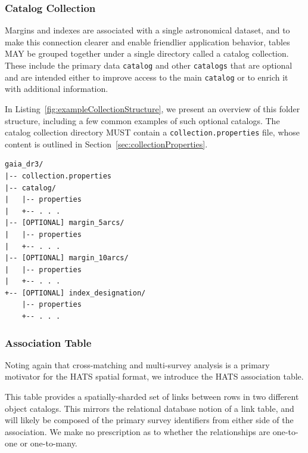 \documentclass[11pt,a4paper]{ivoa}
\begin{document}
\subsubsection{Catalog Collection} \label{sec:collection}

Margins and indexes are associated with a single astronomical dataset, and to make this connection clearer and enable friendlier application behavior, tables MAY be grouped together under a single directory called a catalog collection.
These include the primary data \texttt{catalog} and other \texttt{catalogs} that are optional and are intended either to improve access to the main \texttt{catalog} or to enrich it with additional information. 

In Listing~\ref{fig:exampleCollectionStructure}, we present an overview of this folder structure, including a few common examples of such optional catalogs.
The catalog collection directory MUST contain a \texttt{collection.properties} file, whose content is outlined in Section~\ref{sec:collectionProperties}.

\begin{minipage}{\linewidth}
\begin{lstlisting}[caption=Example collection directory contents, label=fig:exampleCollectionStructure]
gaia_dr3/
|-- collection.properties
|-- catalog/
|   |-- properties
|   +-- . . .
|-- [OPTIONAL] margin_5arcs/
|   |-- properties
|   +-- . . .
|-- [OPTIONAL] margin_10arcs/
|   |-- properties
|   +-- . . .
+-- [OPTIONAL] index_designation/
    |-- properties
    +-- . . .
\end{lstlisting}
\end{minipage}

\subsubsection{Association Table} \label{sec:association}

Noting again that cross-matching and multi-survey analysis is a primary motivator for the HATS spatial format, we introduce the HATS association table. 

This table provides a spatially-sharded set of links between rows in two different object catalogs. 
This mirrors the relational database notion of a link table, and will likely be composed of the primary survey identifiers from either side of the association.
We make no prescription as to whether the relationships are one-to-one or one-to-many. \par
\end{document}
